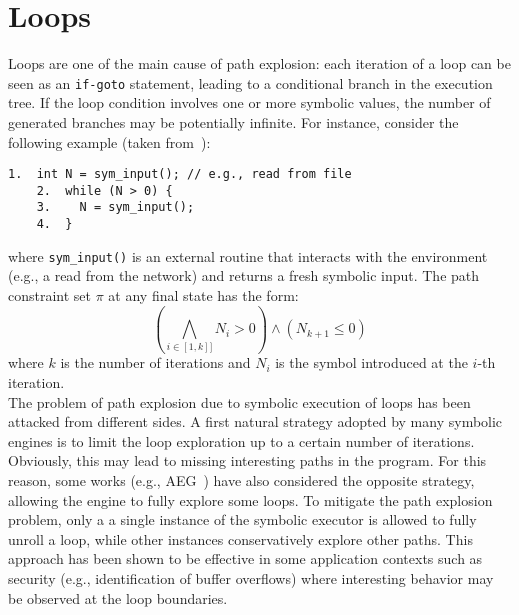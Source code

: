 
\section{Loops}
\label{se:loops}

Loops are one of the main cause of path explosion: each iteration of a loop can be seen as an {\tt if-goto} statement, leading to a conditional branch in the execution tree. If the loop condition involves one or more symbolic values, the number of generated branches may be potentially infinite. For instance, consider the following example (taken from~\cite{CS-CACM13}):
    \begin{lstlisting}[basicstyle=\ttfamily\small]
    1.  int N = sym_input(); // e.g., read from file
    2.  while (N > 0) {
    3.    N = sym_input();  
    4.  }
    \end{lstlisting}
where \texttt{sym\_input()} is an external routine that interacts with the environment (e.g., a read from the network) and returns a fresh symbolic input. The path constraint set $\pi$ at any final state has the form:
  \[ \left ( \bigwedge_{i \in [1, k]]} N_i > 0 \right ) \wedge (N_{k+1} \leq 0) \]
where  $k$ is the number of iterations and $N_i$ is the symbol introduced at the $i$-th iteration.\\

The problem of path explosion due to symbolic execution of loops has been attacked from different sides. A first natural strategy adopted by many symbolic engines is to limit the loop exploration up to a certain number of iterations. Obviously, this may lead to missing interesting paths in the program. For this reason, some works (e.g., {\sc AEG}~\cite{AEG-NDSS11}) have also considered the opposite strategy, allowing the engine to fully explore some loops. To mitigate the path explosion problem, only a a single instance of the symbolic executor is allowed to fully unroll a loop, while other instances conservatively explore other paths. This approach has been shown to be effective in some application contexts such as security (e.g., identification of buffer overflows) where interesting behavior may be observed at the loop boundaries.

